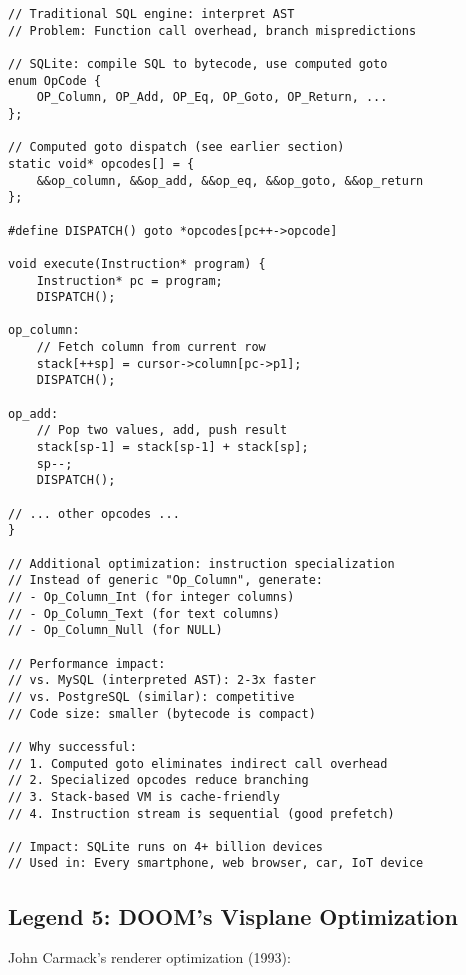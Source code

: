 \begin{lstlisting}
// Traditional SQL engine: interpret AST
// Problem: Function call overhead, branch mispredictions

// SQLite: compile SQL to bytecode, use computed goto
enum OpCode {
    OP_Column, OP_Add, OP_Eq, OP_Goto, OP_Return, ...
};

// Computed goto dispatch (see earlier section)
static void* opcodes[] = {
    &&op_column, &&op_add, &&op_eq, &&op_goto, &&op_return
};

#define DISPATCH() goto *opcodes[pc++->opcode]

void execute(Instruction* program) {
    Instruction* pc = program;
    DISPATCH();

op_column:
    // Fetch column from current row
    stack[++sp] = cursor->column[pc->p1];
    DISPATCH();

op_add:
    // Pop two values, add, push result
    stack[sp-1] = stack[sp-1] + stack[sp];
    sp--;
    DISPATCH();

// ... other opcodes ...
}

// Additional optimization: instruction specialization
// Instead of generic "Op_Column", generate:
// - Op_Column_Int (for integer columns)
// - Op_Column_Text (for text columns)
// - Op_Column_Null (for NULL)

// Performance impact:
// vs. MySQL (interpreted AST): 2-3x faster
// vs. PostgreSQL (similar): competitive
// Code size: smaller (bytecode is compact)

// Why successful:
// 1. Computed goto eliminates indirect call overhead
// 2. Specialized opcodes reduce branching
// 3. Stack-based VM is cache-friendly
// 4. Instruction stream is sequential (good prefetch)

// Impact: SQLite runs on 4+ billion devices
// Used in: Every smartphone, web browser, car, IoT device
\end{lstlisting}

\subsection{Legend 5: DOOM's Visplane Optimization}

John Carmack's renderer optimization (1993):

